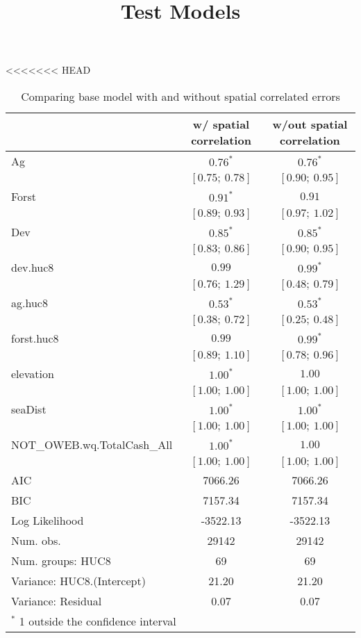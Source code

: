 \documentclass[12pt,a4paper,titlepage]{article}
\title{Test Models}
\begin{document}
\begin{table}
<<<<<<< HEAD
\caption{Comparing base model with and without spatial correlated errors}
\begin{center}
\begin{tabular}{l c c }
\hline
                            & w/ spatial correlation & w/out spatial correlation \\
\hline
Ag                          & $0.76^{*}$      & $0.76^{*}$      \\
                            & $[0.75;\ 0.78]$ & $[0.90;\ 0.95]$ \\
Forst                       & $0.91^{*}$      & $0.91$          \\
                            & $[0.89;\ 0.93]$ & $[0.97;\ 1.02]$ \\
Dev                         & $0.85^{*}$      & $0.85^{*}$      \\
                            & $[0.83;\ 0.86]$ & $[0.90;\ 0.95]$ \\
dev.huc8                    & $0.99$          & $0.99^{*}$      \\
                            & $[0.76;\ 1.29]$ & $[0.48;\ 0.79]$ \\
ag.huc8                     & $0.53^{*}$      & $0.53^{*}$      \\
                            & $[0.38;\ 0.72]$ & $[0.25;\ 0.48]$ \\
forst.huc8                  & $0.99$          & $0.99^{*}$      \\
                            & $[0.89;\ 1.10]$ & $[0.78;\ 0.96]$ \\
elevation                   & $1.00^{*}$      & $1.00$          \\
                            & $[1.00;\ 1.00]$ & $[1.00;\ 1.00]$ \\
seaDist                     & $1.00^{*}$      & $1.00^{*}$      \\
                            & $[1.00;\ 1.00]$ & $[1.00;\ 1.00]$ \\
NOT\_OWEB.wq.TotalCash\_All & $1.00^{*}$      & $1.00$          \\
                            & $[1.00;\ 1.00]$ & $[1.00;\ 1.00]$ \\
\hline
AIC                         & 7066.26         & 7066.26         \\
BIC                         & 7157.34         & 7157.34         \\
Log Likelihood              & -3522.13        & -3522.13        \\
Num. obs.                   & 29142           & 29142           \\
Num. groups: HUC8           & 69              & 69              \\
Variance: HUC8.(Intercept)  & 21.20           & 21.20           \\
Variance: Residual          & 0.07            & 0.07            \\
\hline
\multicolumn{3}{l}{\scriptsize{$^*$ 1 outside the confidence interval}}
\end{tabular}
\label{table:coefficients}
\end{center}
\end{table}
\end{document}
